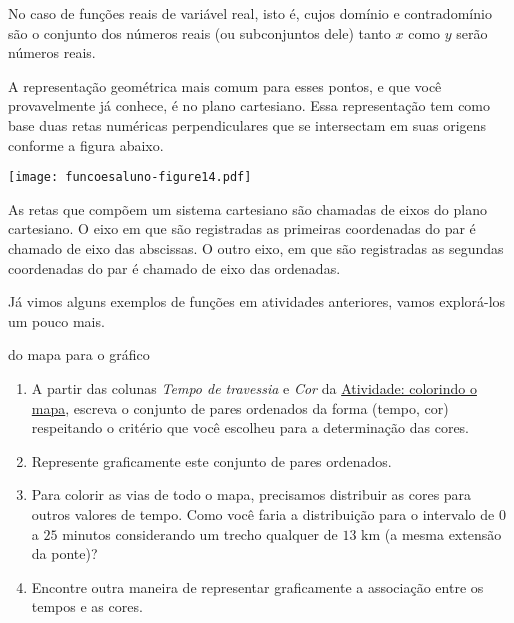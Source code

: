 \documentclass[extrafontsizes, twoside, 11pt, openright, final]{memoir}
\begin{document}
No caso de funções reais de variável real, isto é, cujos domínio e contradomínio são o conjunto dos números reais (ou subconjuntos dele) tanto $x$ como $y$ serão números reais.

A representação geométrica mais comum para esses pontos, e que você provavelmente já conhece, é no plano cartesiano. Essa representação tem como base duas retas numéricas perpendiculares que se intersectam em suas origens conforme a figura abaixo.

\begin{center}
	\texttt{[image: funcoesaluno-figure14.pdf]}
\end{center}

As retas que compõem um sistema cartesiano são chamadas de eixos do plano cartesiano. O eixo em que são registradas as primeiras coordenadas do par é chamado de eixo das abscissas. O outro eixo, em que são registradas as segundas coordenadas do par é chamado de eixo das ordenadas.

Já vimos alguns exemplos de funções em atividades anteriores, vamos explorá-los um pouco mais.


\begin{task}{ do mapa para o gráfico}
	\label{\detokenize{AF106-4:ativ-funcoes-do-mapa-para-grafico}}\label{\detokenize{AF106-4:atividade-do-mapa-para-o-grafico}}

	\begin{enumerate}
		\item A partir das colunas \emph{Tempo de travessia} e \emph{Cor} da {\hyperref[\detokenize{AF106-2:ativ-funcoes-colorindo-o-mapa}]{Atividade: colorindo o mapa}}, escreva o conjunto de pares ordenados da forma (tempo, cor) respeitando o critério que você escolheu para a determinação das cores.

		\item Represente graficamente este conjunto de pares ordenados.

		\item Para colorir as vias de todo o mapa, precisamos distribuir as cores para outros valores de tempo. Como você faria a distribuição para o intervalo de $0$ a $25$ minutos considerando um trecho qualquer de $13$ km (a mesma extensão da ponte)?

		\item Encontre outra maneira de representar graficamente a associação entre os tempos e as cores.

	\end{enumerate}

\end{task}
\end{document}
